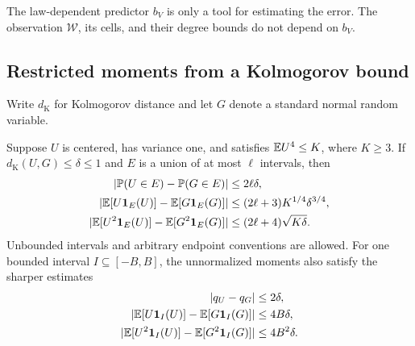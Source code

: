 The law-dependent predictor $b_V$ is only a tool for estimating the error.
The observation $\mathcal W$, its cells, and their degree bounds do not
depend on $b_V$.

\subsection{Restricted moments from a Kolmogorov bound}

Write $d_{\mathrm K}$ for Kolmogorov distance and let $G$ denote a standard
normal random variable.

\begin{lemma}
\label{amp:restricted}
Suppose $U$ is centered, has variance one, and satisfies $\mathbb E U^4\le K$,
where $K\ge3$.  If $d_{\mathrm K}(U,G)\le\delta\le1$ and $E$ is a
union of at most $\ell$ intervals, then
\begin{align}
 |\mathbb P(U\in E)-\mathbb P(G\in E)|&\le2\ell\delta,\\
 |\mathbb E[U\mathbf 1_E(U)]-\mathbb E[G\mathbf 1_E(G)]|
   &\le(2\ell+3)K^{1/4}\delta^{3/4},\\
 |\mathbb E[U^2\mathbf 1_E(U)]-\mathbb E[G^2\mathbf 1_E(G)]|
   &\le(2\ell+4)\sqrt{K\delta}.
 \label{amp:restricted-bounds}
\end{align}
Unbounded intervals and arbitrary endpoint conventions are allowed.
For one bounded interval $I\subseteq[-B,B]$, the unnormalized moments
also satisfy the sharper estimates
\begin{equation}
 \begin{aligned}
 |q_U-q_G|&\le2\delta,\\
 |\mathbb E[U\mathbf 1_I(U)]-\mathbb E[G\mathbf 1_I(G)]|&\le4B\delta,\\
 |\mathbb E[U^2\mathbf 1_I(U)]-\mathbb E[G^2\mathbf 1_I(G)]|&\le4B^2\delta.
 \end{aligned}
 \label{amp:bounded-moments}
\end{equation}
\end{lemma}


